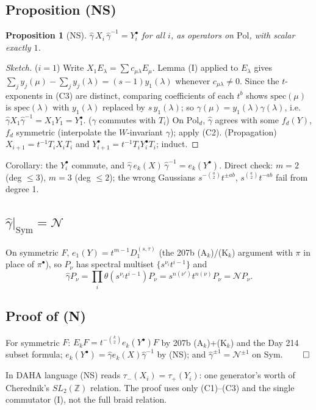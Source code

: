 \documentclass[11pt]{article}
\newtheorem{proposition}[lemma]{Proposition}
\theoremstyle{definition}
\newcommand{\cN}{\mathcal{N}}
\newcommand{\bul}{\bullet}
\begin{document}
\subsection{Proposition (NS)}
\begin{proposition}[NS]
$\hat\gamma\,X_i\,\hat\gamma^{-1}=Y_i^\bul$ for all $i$, as operators on $\mathrm{Pol}$, with scalar exactly $1$.
\end{proposition}
\begin{proof}[Sketch]
($i=1$) Write $X_1E_\lambda=\sum c_{\mu\lambda}E_\mu$. Lemma (I) applied to $E_\lambda$ gives $\sum_jy_j(\mu)-\sum_jy_j(\lambda)=(s-1)y_1(\lambda)$ whenever $c_{\mu\lambda}\ne0$. Since the $t$-exponents in (C3) are distinct, comparing coefficients of each $t^b$ shows $\mathrm{spec}(\mu)$ is $\mathrm{spec}(\lambda)$ with $y_1(\lambda)$ replaced by $s\,y_1(\lambda)$; so $\gamma(\mu)=y_1(\lambda)\gamma(\lambda)$, i.e.\ $\hat\gamma X_1\hat\gamma^{-1}=X_1Y_1=Y_1^\bul$.
($\hat\gamma$ commutes with $T_i$) On $\mathrm{Pol}_d$, $\hat\gamma$ agrees with some $f_d(Y)$, $f_d$ symmetric (interpolate the $W$-invariant $\gamma$); apply (C2).
(Propagation) $X_{i+1}=t^{-1}T_iX_iT_i$ and $Y^\bul_{i+1}=t^{-1}T_iY^\bul_iT_i$; induct.
\end{proof}
Corollary: the $Y^\bul_i$ commute, and $\hat\gamma\,e_k(X)\,\hat\gamma^{-1}=e_k(Y^\bul)$. Direct check: $m=2$ (deg $\le3$), $m=3$ (deg $\le2$); the wrong Gaussians $s^{-\binom a2}t^{\pm ab}$, $s^{\binom a2}t^{-ab}$ fail from degree 1.

\subsection{\texorpdfstring{$\hat\gamma|_{\mathrm{Sym}}=\cN$}{gamma restricted to Sym is N}}
On symmetric $F$, $e_1(Y)=t^{m-1}D_1^{(s,\tau)}$ (the 207b (A$_k$)/(K$_k$) argument with $\pi$ in place of $\pi^\bul$), so $P_\nu$ has spectral multiset $\{s^{\nu_i}t^{i-1}\}$ and
\[
\hat\gamma P_\nu=\prod_i\theta(s^{\nu_i}t^{i-1})P_\nu=s^{n(\nu')}t^{n(\nu)}P_\nu=\cN P_\nu.
\]

\subsection{Proof of (N)}
For symmetric $F$: $E_kF=t^{-\binom k2}e_k(Y^\bul)F$ by 207b (A$_k$)+(K$_k$) and the Day 214 subset formula; $e_k(Y^\bul)=\hat\gamma e_k(X)\hat\gamma^{-1}$ by (NS); and $\hat\gamma^{\pm1}=\cN^{\pm1}$ on Sym. $\qed$

In DAHA language (NS) reads $\tau_-(X_i)=\tau_+(Y_i)$: one generator's worth of Cherednik's $SL_2(\mathbb Z)$ relation. The proof uses only (C1)--(C3) and the single commutator (I), not the full braid relation.
\end{document}
